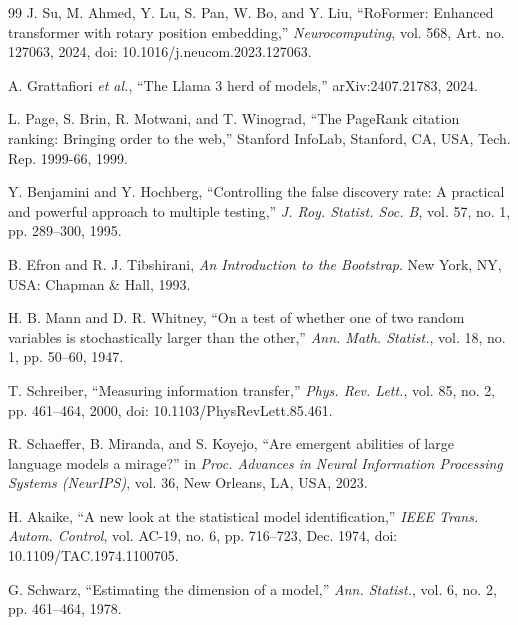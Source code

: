 \begin{thebibliography}{99}
J. Su, M. Ahmed, Y. Lu, S. Pan, W. Bo, and Y. Liu,
``RoFormer: Enhanced transformer with rotary position embedding,''
\textit{Neurocomputing}, vol. 568, Art. no. 127063, 2024,
doi: 10.1016/j.neucom.2023.127063.

A. Grattafiori \textit{et al.},
``The Llama 3 herd of models,''
arXiv:2407.21783, 2024.

L. Page, S. Brin, R. Motwani, and T. Winograd,
``The PageRank citation ranking: Bringing order to the web,''
Stanford InfoLab, Stanford, CA, USA, Tech. Rep. 1999-66, 1999.

Y. Benjamini and Y. Hochberg,
``Controlling the false discovery rate: A practical and powerful approach to multiple testing,''
\textit{J. Roy. Statist. Soc. B}, vol. 57, no. 1, pp. 289--300, 1995.

B. Efron and R. J. Tibshirani,
\textit{An Introduction to the Bootstrap}.
New York, NY, USA: Chapman \& Hall, 1993.

H. B. Mann and D. R. Whitney,
``On a test of whether one of two random variables is stochastically larger than the other,''
\textit{Ann. Math. Statist.}, vol. 18, no. 1, pp. 50--60, 1947.

T. Schreiber,
``Measuring information transfer,''
\textit{Phys. Rev. Lett.}, vol. 85, no. 2, pp. 461--464, 2000,
doi: 10.1103/PhysRevLett.85.461.

R. Schaeffer, B. Miranda, and S. Koyejo,
``Are emergent abilities of large language models a mirage?''
in \textit{Proc. Advances in Neural Information Processing Systems (NeurIPS)},
vol. 36, New Orleans, LA, USA, 2023.

H. Akaike,
``A new look at the statistical model identification,''
\textit{IEEE Trans. Autom. Control}, vol. AC-19, no. 6, pp. 716--723, Dec. 1974,
doi: 10.1109/TAC.1974.1100705.

G. Schwarz,
``Estimating the dimension of a model,''
\textit{Ann. Statist.}, vol. 6, no. 2, pp. 461--464, 1978.

\end{thebibliography}
